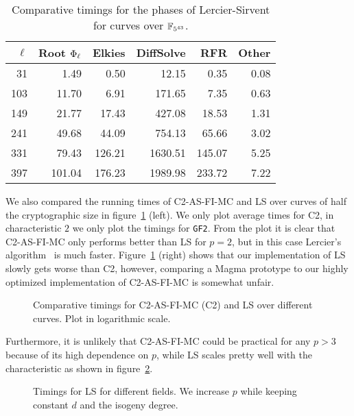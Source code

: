 \begin{table}[ht]
  \centering
  \begin{tabular}{r r r r r r}
    \hline
    $\ell$ & Root $\Phi_\ell$ & Elkies & DiffSolve & RFR & Other\\
    \hline
    31&1.49&0.50&12.15&0.35&0.08\\
    103&11.70&6.91&171.65&7.35&0.63\\
    149&21.77&17.43&427.08&18.53&1.31\\
    241&49.68&44.09&754.13&65.66&3.02\\
    331&79.43&126.21&1630.51&145.07&5.25\\
    397&101.04&176.23&1989.98&233.72&7.22\\
    \hline
  \end{tabular}
  \caption{Comparative timings for the phases of Lercier-Sirvent for curves over $\mathbb{F}_{5^{43}}$.}
  \label{tab:ls}
\end{table}

We also compared the running times of C2-AS-FI-MC and LS over curves
of half the cryptographic size in figure~\ref{fig:comp} (left). We
only plot average times for C2, in characteristic $2$ we only plot the
timings for \texttt{GF2}. From the plot it is clear that C2-AS-FI-MC
only performs better than LS for $p=2$, but in this case Lercier's
algorithm~\cite{lercier96} is much faster.  Figure~\ref{fig:comp}
(right) shows that our implementation of LS slowly gets worse than C2,
however, comparing a Magma prototype to our highly optimized
implementation of C2-AS-FI-MC is somewhat unfair.

\begin{figure}
  \centering
   \caption{Comparative timings for C2-AS-FI-MC (C2) and LS over
     different curves. Plot in logarithmic scale.}
  \label{fig:comp}
\end{figure}

Furthermore, it is unlikely that C2-AS-FI-MC could be
practical for any $p>3$ because of its high dependence on $p$, while
LS scales pretty well with the characteristic as shown in
figure~\ref{fig:LSp}.

\begin{figure}
  \centering
  \caption{Timings for LS for different fields. We increase $p$ while
    keeping constant $d$ and the isogeny degree.}
  \label{fig:LSp}
\end{figure}

